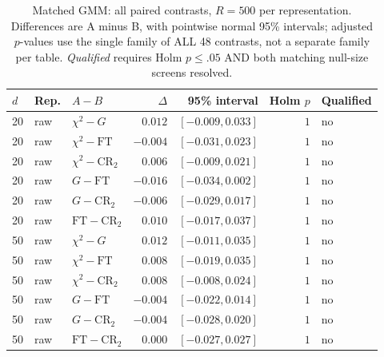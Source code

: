 \begin{table}[t]
\caption{Matched GMM: all paired contrasts, $R=500$ per representation. Differences are A minus B, with pointwise normal 95\% intervals; adjusted $p$-values use the single family of ALL 48 contrasts, not a separate family per table. \emph{Qualified} requires Holm $p\le .05$ AND both matching null-size screens resolved.}
\label{tab:matched-f-contrasts-gmm-matched}
\centering\small
\setlength{\tabcolsep}{8pt}\renewcommand{\arraystretch}{1.2}
\begin{tabular}{lllrrrl}
\toprule
$d$ & Rep. & $A-B$ & $\Delta$ & 95\% interval & Holm $p$ & Qualified \\
\midrule
20 & raw & $\chi^2-G$ & $0.012$ & $[-0.009, 0.033]$ & $1$ & no \\
20 & raw & $\chi^2-\mathrm{FT}$ & $-0.004$ & $[-0.031, 0.023]$ & $1$ & no \\
20 & raw & $\chi^2-\mathrm{CR}_2$ & $0.006$ & $[-0.009, 0.021]$ & $1$ & no \\
20 & raw & $G-\mathrm{FT}$ & $-0.016$ & $[-0.034, 0.002]$ & $1$ & no \\
20 & raw & $G-\mathrm{CR}_2$ & $-0.006$ & $[-0.029, 0.017]$ & $1$ & no \\
20 & raw & $\mathrm{FT}-\mathrm{CR}_2$ & $0.010$ & $[-0.017, 0.037]$ & $1$ & no \\
50 & raw & $\chi^2-G$ & $0.012$ & $[-0.011, 0.035]$ & $1$ & no \\
50 & raw & $\chi^2-\mathrm{FT}$ & $0.008$ & $[-0.019, 0.035]$ & $1$ & no \\
50 & raw & $\chi^2-\mathrm{CR}_2$ & $0.008$ & $[-0.008, 0.024]$ & $1$ & no \\
50 & raw & $G-\mathrm{FT}$ & $-0.004$ & $[-0.022, 0.014]$ & $1$ & no \\
50 & raw & $G-\mathrm{CR}_2$ & $-0.004$ & $[-0.028, 0.020]$ & $1$ & no \\
50 & raw & $\mathrm{FT}-\mathrm{CR}_2$ & $0.000$ & $[-0.027, 0.027]$ & $1$ & no \\
\bottomrule
\end{tabular}
\end{table}

